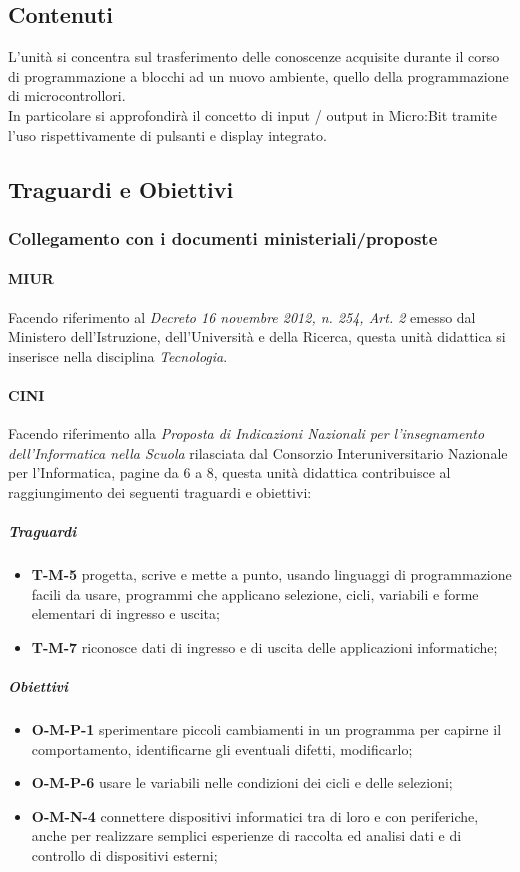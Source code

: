 \documentclass[../../relazione.tex]{subfiles}
\begin{document}
\subsection{Contenuti}
L'unità si concentra sul trasferimento delle conoscenze acquisite durante il corso di programmazione a blocchi ad un nuovo ambiente, quello della programmazione di microcontrollori.\\
In particolare si approfondirà il concetto di input / output in Micro:Bit tramite l'uso rispettivamente di pulsanti e display integrato. 

\subsection{Traguardi e Obiettivi}

\subsubsection{Collegamento con i documenti ministeriali/proposte}
\paragraph{MIUR}
Facendo riferimento al \textit{Decreto 16 novembre 2012, n. 254, Art. 2} \cite{MIURWeb, MIUR254} emesso dal Ministero dell'Istruzione, dell'Università e della Ricerca, questa unità didattica si inserisce nella disciplina \textit{Tecnologia}.

\paragraph{CINI}
Facendo riferimento alla \textit{Proposta di Indicazioni Nazionali per l'insegnamento dell'Informatica nella Scuola} \cite{CINI} rilasciata dal Consorzio Interuniversitario Nazionale per l'Informatica, pagine da 6 a 8, questa unità didattica contribuisce al raggiungimento dei seguenti traguardi e obiettivi:
\subparagraph{Traguardi}
\begin{itemize}
	\item \textbf{T-M-5} progetta, scrive e mette a punto, usando linguaggi di programmazione facili da usare, programmi che applicano selezione, cicli, variabili e forme elementari di ingresso e uscita;
	\item \textbf{T-M-7} riconosce dati di ingresso e di uscita delle applicazioni informatiche;
\end{itemize}
\subparagraph{Obiettivi}
\begin{itemize}
	\item \textbf{O-M-P-1} sperimentare piccoli cambiamenti in un programma per capirne il comportamento, identificarne gli eventuali difetti, modificarlo;
	\item \textbf{O-M-P-6} usare le variabili nelle condizioni dei cicli e delle selezioni;
	\item \textbf{O-M-N-4} connettere dispositivi informatici tra di loro e con periferiche, anche per realizzare semplici esperienze di raccolta ed analisi dati e di controllo di dispositivi esterni;
\end{itemize}
\end{document}
